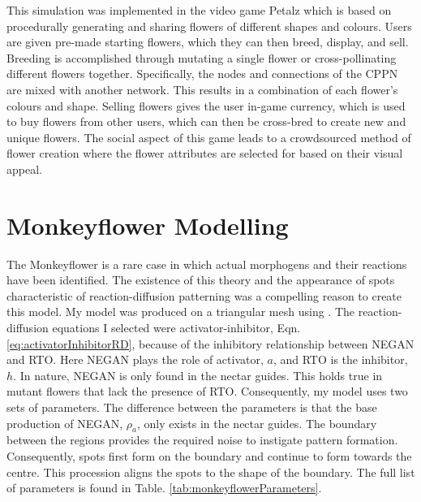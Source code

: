 This simulation was implemented in the video game Petalz which is based on procedurally generating and sharing flowers of different shapes and colours. Users are given pre-made starting flowers, which they can then breed, display, and sell. Breeding is accomplished through mutating a single flower or cross-pollinating different flowers together. Specifically, the nodes and connections of the CPPN are mixed with another network. This results in a combination of each flower's colours and shape. Selling flowers gives the user in-game currency, which is used to buy flowers from other users, which can then be cross-bred to create new and unique flowers. The social aspect of this game leads to a crowdsourced method of flower creation where the flower attributes are selected for based on their visual appeal.

\section{Monkeyflower Modelling}
The Monkeyflower is a rare case in which actual morphogens and their reactions have been identified. The existence of this theory and the appearance of spots characteristic of reaction-diffusion patterning was a compelling reason to create this model. My model was produced on a triangular mesh using \ProgramName{}. The reaction-diffusion equations I selected were activator-inhibitor, Eqn. \eqref{eq:activatorInhibitorRD}, because of the inhibitory relationship between NEGAN and RTO. Here NEGAN plays the role of activator, $a$, and RTO is the inhibitor, $h$. In nature, NEGAN is only found in the nectar guides. This holds true in mutant flowers that lack the presence of RTO. Consequently, my model uses two sets of parameters. The difference between the parameters is that the base production of NEGAN, $\rho_a$, only exists in the nectar guides. The boundary between the regions provides the required noise to instigate pattern formation. Consequently, spots first form on the boundary and continue to form towards the centre. This procession aligns the spots to the shape of the boundary. The full list of parameters is found in Table. \ref{tab:monkeyflowerParameters}.

\begin{table}[ht]
	\centering
	\caption[Parameters for the monkeyflower model using activator-inhibitor equations]{Parameters for the monkeyflower model using activator-inhibitor equations (Eqn. \ref{eq:activatorInhibitorRD}). The  value after the comma is used at the periphery. The initial morphogen distribution has NEGAN $= 0$ and RTO $= 1$ everywhere.}
	\label{tab:monkeyflowerParameters}
\end{table}

